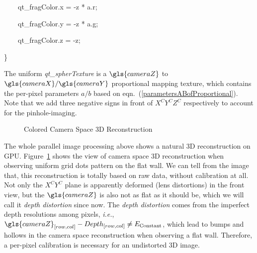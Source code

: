 \bigskip

{\ttfamily
\textcolor[rgb]{0.7529412,0.7529412,0.7529412}{\ \ \ \ }qt\_fragColor.x\textcolor[rgb]{0.7529412,0.7529412,0.7529412}{
} = \textcolor[rgb]{0.7529412,0.7529412,0.7529412}{
}{}-z\textcolor[rgb]{0.7529412,0.7529412,0.7529412}{
}*\textcolor[rgb]{0.7529412,0.7529412,0.7529412}{ }a.r;}

{\ttfamily
\textcolor[rgb]{0.7529412,0.7529412,0.7529412}{\ \ \ \ }qt\_fragColor.y\textcolor[rgb]{0.7529412,0.7529412,0.7529412}{
} = \textcolor[rgb]{0.7529412,0.7529412,0.7529412}{
}{}-z\textcolor[rgb]{0.7529412,0.7529412,0.7529412}{
}*\textcolor[rgb]{0.7529412,0.7529412,0.7529412}{ }a.g;}

{\ttfamily
\textcolor[rgb]{0.7529412,0.7529412,0.7529412}{\ \ \ \ }qt\_fragColor.z\textcolor[rgb]{0.7529412,0.7529412,0.7529412}{
} = \textcolor[rgb]{0.7529412,0.7529412,0.7529412}{ }{}-z;}

{\ttfamily
\}}

%
The uniform \emph{qt\_spherTexture} is a \(\gls{cameraZ}\) to \(\gls{cameraX}/\gls{cameraY}\) proportional mapping texture, which contains the per-pixel parameters \(a/b\) based on eqn.~(\ref{parametersABofProportional}). Note that we add three negative signs in front of \(X^CY^CZ^C\) respectively to account for the pinhole-imaging. %
%
\begin{figure}[t]
\centering
{}
\caption{Colored Camera Space \gls{3D} Reconstruction}
\label{reconstructionInCameraSpace}
\end{figure}%
%
The whole parallel image processing above shows a natural \gls{3D} reconstruction on \gls{GPU}. Figure~\ref{reconstructionInCameraSpace} shows the view of camera space \gls{3D} reconstruction when observing uniform grid dots pattern on the flat wall. We can tell from the image that, this reconstruction is totally based on raw data, without calibration at all. Not only the \(X^CY^C\) plane is apparently deformed (lens distortions) in the front view, but the \(\gls{cameraZ}\) is also not as flat as it should be, which we will call it \emph{depth distortion} since now. The \emph{depth distortion} comes from the imperfect depth resolutions among pixels, \textit{i.e.}, \(\gls{cameraZ}_{[row, col]} - Depth_{[row, col]} \neq E_{\text{Constant}}\), which lead to bumps and hollows in the camera space reconstruction when observing a flat wall. Therefore, a per-pixel calibration is necessary for an undistorted \gls{3D} image.

